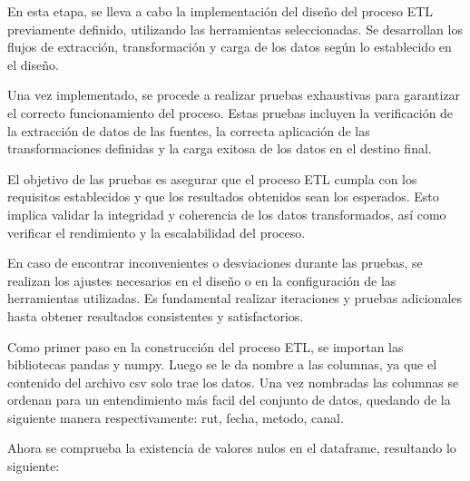 En esta etapa, se lleva a cabo la implementación del diseño del proceso ETL previamente definido, utilizando las herramientas seleccionadas. Se desarrollan los flujos de extracción, transformación y carga de los datos según lo establecido en el diseño.

Una vez implementado, se procede a realizar pruebas exhaustivas para garantizar el correcto funcionamiento del proceso. Estas pruebas incluyen la verificación de la extracción de datos de las fuentes, la correcta aplicación de las transformaciones definidas y la carga exitosa de los datos en el destino final.

El objetivo de las pruebas es asegurar que el proceso ETL cumpla con los requisitos establecidos y que los resultados obtenidos sean los esperados. Esto implica validar la integridad y coherencia de los datos transformados, así como verificar el rendimiento y la escalabilidad del proceso.

En caso de encontrar inconvenientes o desviaciones durante las pruebas, se realizan los ajustes necesarios en el diseño o en la configuración de las herramientas utilizadas. Es fundamental realizar iteraciones y pruebas adicionales hasta obtener resultados consistentes y satisfactorios.

Como primer paso en la construcción del proceso ETL, se importan las bibliotecas pandas y numpy. Luego se le da nombre a las columnas, ya que el contenido del archivo csv solo trae los datos. Una vez nombradas las columnas se ordenan para un entendimiento más facil del conjunto de datos, quedando de la siguiente manera respectivamente: rut, fecha, metodo, canal.

Ahora se comprueba la existencia de valores nulos en el dataframe, resultando lo siguiente:

